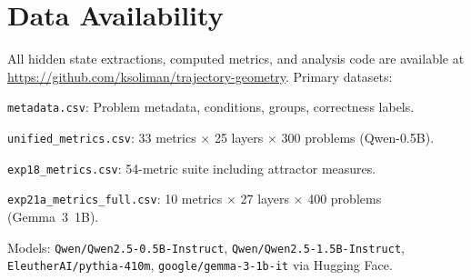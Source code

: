 \documentclass[11pt,twocolumn]{article}
\begin{document}
\section{Data Availability}
\label{app:data}

All hidden state extractions, computed metrics, and analysis code are available at \url{https://github.com/ksoliman/trajectory-geometry}. Primary datasets:

\texttt{metadata.csv}: Problem metadata, conditions, groups, correctness labels.

\texttt{unified\_metrics.csv}: 33 metrics $\times$ 25 layers $\times$ 300 problems (Qwen-0.5B).

\texttt{exp18\_metrics.csv}: 54-metric suite including attractor measures.

\texttt{exp21a\_metrics\_full.csv}: 10 metrics $\times$ 27 layers $\times$ 400 problems (Gemma~3~1B).

Models: \texttt{Qwen/Qwen2.5-0.5B-Instruct}, \texttt{Qwen/Qwen2.5-1.5B-Instruct}, \texttt{EleutherAI/pythia-410m}, \texttt{google/gemma-3-1b-it} via Hugging Face.
\end{document}
